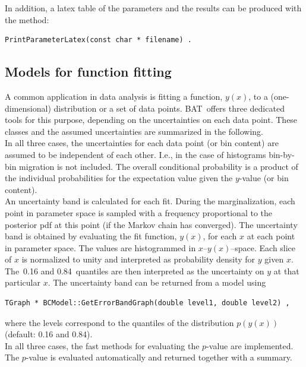 \documentclass[11pt, a4paper]{article}
\newcommand{\bat}{{\sc BAT}}
\begin{document}
\noindent
In addition, a latex table of the parameters and the results can be
produced with the method:
%
\begin{verbatim}
PrintParameterLatex(const char * filename) .
\end{verbatim}

\subsection{Models for function fitting}
\label{subsection:fitting}

A common application in data analysis is fitting a function, $y(x)$,
to a (one-dimensional) distribution or a set of data
points. \bat\ offers three dedicated tools for this purpose, depending
on the uncertainties on each data point. These classes and the assumed
uncertainties are summarized in the following. \\

\noindent
In all three cases, the uncertainties for each data point (or bin
content) are assumed to be independent of each other. I.e., in the
case of histograms bin-by-bin migration is not included. The overall
conditional probability is a product of the individual probabilities
for the expectation value given the $y$-value (or bin content). \\

\noindent
An uncertainty band is calculated for each fit. During the
marginalization, each point in parameter space is sampled with a
frequency proportional to the posterior pdf at this point (if the
Markov chain has converged). The uncertainty band is obtained by
evaluating the fit function, $y(x)$, for each $x$ at each point in
parameter space. The values are histogrammed in
$x$--$y(x)$--space. Each slice of $x$ is normalized to unity and
interpreted as probability density for $y$ given $x$. The~0.16 and
0.84~quantiles are then interpreted as the uncertainty on $y$ at that
particular $x$. The uncertainty band can be returned from a model
using
%
\begin{verbatim}
TGraph * BCModel::GetErrorBandGraph(double level1, double level2) ,
\end{verbatim}
%
where the levels correspond to the quantiles of the distribution
$p(y(x))$ (default: 0.16 and 0.84). \\

\noindent
In all three cases, the fast methods for evaluating the $p$-value are
implemented. The $p$-value is evaluated automatically and returned
together with a summary.
\end{document}
